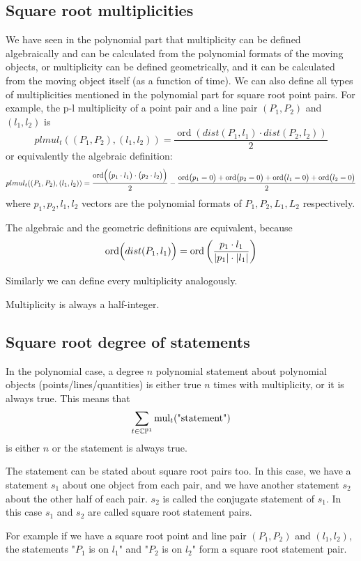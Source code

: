 \documentclass[a4paper]{article}
\newcommand{\ord}{\operatorname{ord}}
\begin{document}
\subsection{Square root multiplicities}
We have seen in the polynomial part that multiplicity can be defined algebraically and can be calculated from the polynomial formats of the moving objects, or multiplicity can be defined geometrically, and it can be calculated from the moving object itself (as a function of time).
We can also define all types of multiplicities mentioned in the polynomial part for square root point pairs.
For example, the p-l multiplicity of a point pair and a line pair $(P_1,P_2)$ and $(l_1,l_2)$ is
$$plmul_t((P_1,P_2),(l_1,l_2))=\frac{\ord(dist(P_1,l_1)\cdot dist(P_2,l_2))}{2}$$
or equivalently the algebraic definition:
$$plmul_t((P_1,P_2),(l_1,l_2))=\frac{\ord\Bigl(\bigl(p_1\cdot l_1\bigr)\cdot \bigl(p_2\cdot l_2\bigr)\Bigr)}{2}-\frac{\ord\bigl(p_1=0\bigr)+\ord\bigl(p_2=0\bigr) +\ord\bigl(l_1=0\bigr)+\ord\bigl(l_2=0\bigr)}{2}$$
where $p_1,p_2,l_1,l_2$ vectors are the polynomial formats of $P_1,P_2,L_1,L_2$ respectively.

The algebraic and the geometric definitions are equivalent, because $$\ord\Bigl(dist(P_1,l_1)\Bigr)=\ord\left(\frac{p_1\cdot l_1}{|p_1|\cdot |l_1|}\right)$$

Similarly we can define every multiplicity analogously.

Multiplicity is always a half-integer.

\subsection{Square root degree of statements}

In the polynomial case, a degree $n$ polynomial statement about polynomial objects (points/lines/quantities) is either true $n$ times with multiplicity, or it is always true. This means that
$$\sum_{t\in\mathbb{C}\mathbb{P}^1} \operatorname{mul}_t(\text{"statement"})$$
is either $n$ or the statement is always true.

The statement can be stated about square root pairs too. In this case, we have a statement $s_1$ about one object from each pair, and we have another statement $s_2$ about the other half of each pair. $s_2$ is called the conjugate statement of $s_1$. In this case $s_1$ and $s_2$ are called square root statement pairs.

For example if we have a square root point and line pair $(P_1,P_2)$ and $(l_1,l_2)$, the statements "$P_1$ is on $l_1$" and "$P_2$ is on $l_2$" form a square root statement pair.
\end{document}
